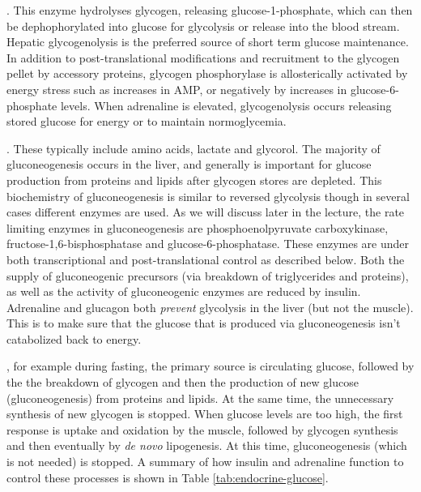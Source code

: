 \documentclass{tufte-handout}
\begin{document}
.  This enzyme hydrolyses glycogen, releasing glucose-1-phosphate, which can then be dephophorylated into glucose for glycolysis or release into the blood stream.  Hepatic glycogenolysis is the preferred source of short term glucose maintenance.  In addition to post-translational modifications and recruitment to the glycogen pellet by accessory proteins, glycogen phosphorylase is allosterically activated by energy stress such as increases in AMP, or negatively by increases in glucose-6-phosphate levels.  When adrenaline is elevated, glycogenolysis occurs releasing stored glucose for energy or to maintain normoglycemia.

.  These typically include amino acids, lactate and glycorol.  The majority of gluconeogenesis occurs in the liver, and generally is important for glucose production from proteins and lipids after glycogen stores are depleted.  This biochemistry of gluconeogenesis is similar to reversed glycolysis though in several cases different enzymes are used.  As we will discuss later in the lecture, the rate limiting enzymes in gluconeogenesis are phosphoenolpyruvate carboxykinase, fructose-1,6-bisphosphatase and glucose-6-phosphatase.  These enzymes are under both transcriptional and post-translational control as described below.  Both the supply of gluconeogenic precursors (via breakdown of triglycerides and proteins), as well as the activity of gluconeogenic enzymes are reduced by insulin.  Adrenaline and glucagon both \emph{prevent} glycolysis in the liver (but not the muscle).  This is to make sure that the glucose that is produced via gluconeogenesis isn't catabolized back to energy.

, for example during fasting, the primary source is circulating glucose, followed by the the breakdown of glycogen and then the production of new glucose (gluconeogenesis) from proteins and lipids.  At the same time, the unnecessary synthesis of new glycogen is stopped.  When glucose levels are too high, the first response is uptake and oxidation by the muscle, followed by glycogen synthesis and then eventually by \textit{de novo} lipogenesis.  At this time, gluconeogenesis (which is not needed) is stopped.  A summary of how insulin and adrenaline function to control these processes is shown in Table \ref{tab:endocrine-glucose}.
\end{document}
